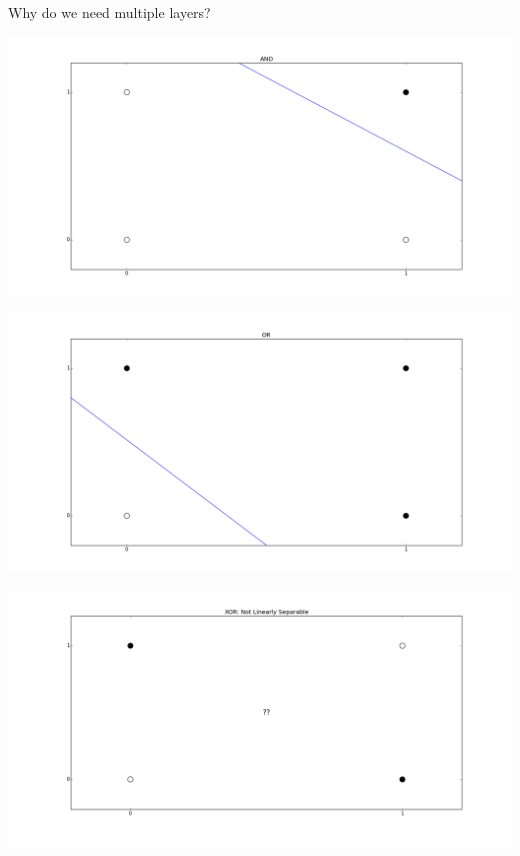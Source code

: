 \begin{frame}
  \begin{center}
    {\Large Why do we need multiple layers?}
  \end{center}
\end{frame}

\begin{frame}
  \begin{center}
    \includegraphics[scale=0.25]{pictures/and.png}
  \end{center}
\end{frame}

\begin{frame}
  \begin{center}
    \includegraphics[scale=0.25]{pictures/or.png}
  \end{center}
\end{frame}

\begin{frame}
  \begin{center}
    \includegraphics[scale=0.25]{pictures/xor.png}
  \end{center}
\end{frame}

